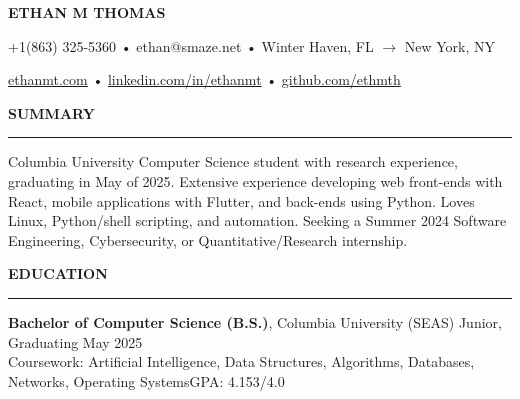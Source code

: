 \documentclass[10pt,letterpaper]{article}
\begin{document}
\begingroup
\centerline{\MakeUppercase{\LARGE\bf Ethan M Thomas}} \medskip
\endgroup

\begingroup
\centerline{+1(863) 325-5360 • ethan@smaze.net • Winter Haven, FL $\rightarrow$ New York, NY}
\endgroup
\par

\begingroup
\centerline{\href{www.ethanmt.com}{ethanmt.com} • \href{https://www.linkedin.com/in/ethanmt/}{linkedin.com/in/ethanmt} • \href{https://github.com/ethmth}{github.com/ethmth}}
\endgroup
\par


\medskip
\MakeUppercase{{\bf Summary}} %
\medskip
\hrule %
\begin{list}{}{\setlength{\leftmargin}{0em}}
    \item
          {Columbia University Computer Science student with research experience, graduating in May of 2025.
          Extensive experience developing web front-ends with React, mobile applications with Flutter, and back-ends using Python.
          Loves Linux, Python/shell scripting, and automation.
          Seeking a Summer 2024 Software Engineering, Cybersecurity, or Quantitative/Research internship.}
\end{list}



\medskip
\MakeUppercase{{\bf Education}}
\medskip
\hrule
\begin{list}{}{\setlength{\leftmargin}{0em}}
    \item
          {\bf Bachelor of Computer Science (B.S.)}, Columbia University (SEAS) \hfill  {Junior, Graduating May 2025}\\
          Coursework: Artificial Intelligence, Data Structures, Algorithms, Databases, Networks, Operating Systems\hfill {GPA: 4.153/4.0}
          \medskip
\end{list}
\end{document}
